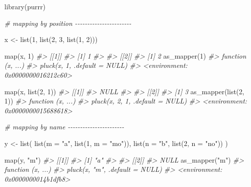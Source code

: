 \documentclass[
]{book}
\newenvironment{Shaded}{\begin{snugshade}}{\end{snugshade}}
\newcommand{\AttributeTok}[1]{\textcolor[rgb]{0.77,0.63,0.00}{#1}}
\newcommand{\CommentTok}[1]{\textcolor[rgb]{0.56,0.35,0.01}{\textit{#1}}}
\newcommand{\DecValTok}[1]{\textcolor[rgb]{0.00,0.00,0.81}{#1}}
\newcommand{\FunctionTok}[1]{\textcolor[rgb]{0.00,0.00,0.00}{#1}}
\newcommand{\NormalTok}[1]{#1}
\newcommand{\OtherTok}[1]{\textcolor[rgb]{0.56,0.35,0.01}{#1}}
\newcommand{\StringTok}[1]{\textcolor[rgb]{0.31,0.60,0.02}{#1}}
\begin{document}
\begin{Shaded}
\begin{Highlighting}[]
\FunctionTok{library}\NormalTok{(purrr)}

\CommentTok{\# mapping by position {-}{-}{-}{-}{-}{-}{-}{-}{-}{-}{-}{-}{-}{-}{-}{-}{-}{-}{-}{-}{-}{-}{-}}

\NormalTok{x }\OtherTok{\textless{}{-}} \FunctionTok{list}\NormalTok{(}\DecValTok{1}\NormalTok{, }\FunctionTok{list}\NormalTok{(}\DecValTok{2}\NormalTok{, }\DecValTok{3}\NormalTok{, }\FunctionTok{list}\NormalTok{(}\DecValTok{1}\NormalTok{, }\DecValTok{2}\NormalTok{)))}

\FunctionTok{map}\NormalTok{(x, }\DecValTok{1}\NormalTok{)}
\CommentTok{\#\textgreater{} [[1]]}
\CommentTok{\#\textgreater{} [1] 1}
\CommentTok{\#\textgreater{} }
\CommentTok{\#\textgreater{} [[2]]}
\CommentTok{\#\textgreater{} [1] 2}
\FunctionTok{as\_mapper}\NormalTok{(}\DecValTok{1}\NormalTok{)}
\CommentTok{\#\textgreater{} function (x, ...) }
\CommentTok{\#\textgreater{} pluck(x, 1, .default = NULL)}
\CommentTok{\#\textgreater{} \textless{}environment: 0x0000000016212c60\textgreater{}}

\FunctionTok{map}\NormalTok{(x, }\FunctionTok{list}\NormalTok{(}\DecValTok{2}\NormalTok{, }\DecValTok{1}\NormalTok{))}
\CommentTok{\#\textgreater{} [[1]]}
\CommentTok{\#\textgreater{} NULL}
\CommentTok{\#\textgreater{} }
\CommentTok{\#\textgreater{} [[2]]}
\CommentTok{\#\textgreater{} [1] 3}
\FunctionTok{as\_mapper}\NormalTok{(}\FunctionTok{list}\NormalTok{(}\DecValTok{2}\NormalTok{, }\DecValTok{1}\NormalTok{))}
\CommentTok{\#\textgreater{} function (x, ...) }
\CommentTok{\#\textgreater{} pluck(x, 2, 1, .default = NULL)}
\CommentTok{\#\textgreater{} \textless{}environment: 0x0000000015688618\textgreater{}}

\CommentTok{\# mapping by name {-}{-}{-}{-}{-}{-}{-}{-}{-}{-}{-}{-}{-}{-}{-}{-}{-}{-}{-}{-}{-}{-}{-}}

\NormalTok{y }\OtherTok{\textless{}{-}} \FunctionTok{list}\NormalTok{(}
  \FunctionTok{list}\NormalTok{(}\AttributeTok{m =} \StringTok{"a"}\NormalTok{, }\FunctionTok{list}\NormalTok{(}\DecValTok{1}\NormalTok{, }\AttributeTok{m =} \StringTok{"mo"}\NormalTok{)),}
  \FunctionTok{list}\NormalTok{(}\AttributeTok{n =} \StringTok{"b"}\NormalTok{, }\FunctionTok{list}\NormalTok{(}\DecValTok{2}\NormalTok{, }\AttributeTok{n =} \StringTok{"no"}\NormalTok{))}
\NormalTok{)}

\FunctionTok{map}\NormalTok{(y, }\StringTok{"m"}\NormalTok{)}
\CommentTok{\#\textgreater{} [[1]]}
\CommentTok{\#\textgreater{} [1] "a"}
\CommentTok{\#\textgreater{} }
\CommentTok{\#\textgreater{} [[2]]}
\CommentTok{\#\textgreater{} NULL}
\FunctionTok{as\_mapper}\NormalTok{(}\StringTok{"m"}\NormalTok{)}
\CommentTok{\#\textgreater{} function (x, ...) }
\CommentTok{\#\textgreater{} pluck(x, "m", .default = NULL)}
\CommentTok{\#\textgreater{} \textless{}environment: 0x0000000014b1dfb8\textgreater{}}


\end{Highlighting}
\end{Shaded}
\end{document}
